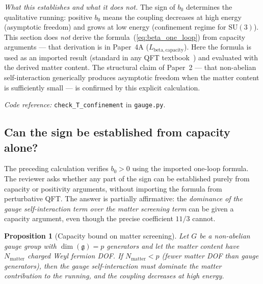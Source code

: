 \documentclass[11pt,a4paper]{article}
\newtheorem{proposition}[theorem]{Proposition}
\theoremstyle{definition}
\newcommand{\SU}{\mathrm{SU}}
\newcommand{\coderef}[2]{\smallskip\noindent\textit{Code reference:} \texttt{#1} in \texttt{#2}.}
\begin{document}
\noindent\textit{What this establishes and what it does not.}\quad
The sign of $b_0$ determines the qualitative running: positive $b_0$
means the coupling decreases at high energy (asymptotic freedom) and
grows at low energy (confinement regime for $\SU(3)$).  This section
does \emph{not} derive the formula~(\ref{eq:beta_one_loop}) from
capacity arguments --- that derivation is in Paper~4A
($L_{\mathrm{beta,capacity}}$).  Here the formula is used as an
imported result (standard in any QFT textbook~\cite{PeskinSchroeder1995})
and evaluated with the derived matter content.  The structural claim
of Paper~2 --- that non-abelian self-interaction generically produces
asymptotic freedom when the matter content is sufficiently small ---
is confirmed by this explicit calculation.

\coderef{check\_T\_confinement}{gauge.py}


\subsection{Can the sign be established from capacity alone?}
\label{sec:AF_from_capacity}

The preceding calculation verifies $b_0 > 0$ using the imported
one-loop formula.  The reviewer asks whether any part of the sign can
be established purely from capacity or positivity arguments, without
importing the formula from perturbative QFT.  The answer is partially
affirmative: the \emph{dominance of the gauge self-interaction term
over the matter screening term} can be given a capacity argument,
even though the precise coefficient $11/3$ cannot.

\begin{proposition}[Capacity bound on matter screening]%
\label{prop:AF_capacity_bound}
Let $G$ be a non-abelian gauge group with $\dim(\mathfrak{g}) = p$
generators and let the matter content have $N_{\mathrm{matter}}$
charged Weyl fermion DOF.  If
$N_{\mathrm{matter}} < p$ (fewer matter DOF than gauge generators),
then the gauge self-interaction must dominate the matter contribution
to the running, and the coupling decreases at high energy.
\end{proposition}
\end{document}
